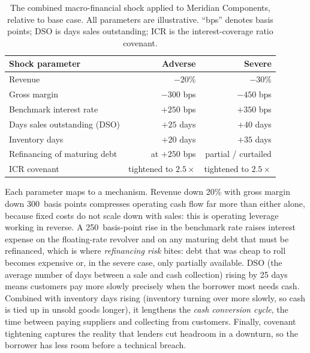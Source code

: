 \begin{table}[t]
\centering
\caption{The combined macro-financial shock applied to Meridian Components,
relative to base case. All parameters are illustrative. ``bps'' denotes basis
points; DSO is days sales outstanding; ICR is the interest-coverage ratio
covenant.}
\label{tab:credit-shock}
\begin{tabular}{@{}lrr@{}}
\toprule
Shock parameter & Adverse & Severe \\
\midrule
Revenue                       & $-20\%$    & $-30\%$ \\
Gross margin                  & $-300$ bps & $-450$ bps \\
Benchmark interest rate       & $+250$ bps & $+350$ bps \\
Days sales outstanding (DSO)  & $+25$ days & $+40$ days \\
Inventory days               & $+20$ days & $+35$ days \\
Refinancing of maturing debt  & at $+250$ bps & partial / curtailed \\
ICR covenant                  & tightened to $2.5\times$ & tightened to $2.5\times$ \\
\bottomrule
\end{tabular}
\end{table}

Each parameter maps to a mechanism. Revenue down 20\% with gross margin down
300~basis points compresses operating cash flow far more than either alone, because
fixed costs do not scale down with sales: this is operating leverage working in
reverse. A 250~basis-point rise in the benchmark rate raises interest expense on
the floating-rate revolver and on any maturing debt that must be refinanced, which
is where \emph{refinancing risk} bites: debt that was cheap to roll becomes
expensive or, in the severe case, only partially available. DSO (the average
number of days between a sale and cash collection) rising by 25 days means
customers pay more slowly precisely when the borrower most needs cash. Combined with
inventory days rising (inventory turning over more slowly, so cash is tied up in
unsold goods longer), it lengthens the \emph{cash conversion cycle}, the time
between paying suppliers and collecting from customers. Finally, covenant tightening
captures the reality that lenders cut headroom in a downturn, so the borrower has
less room before a technical breach.


